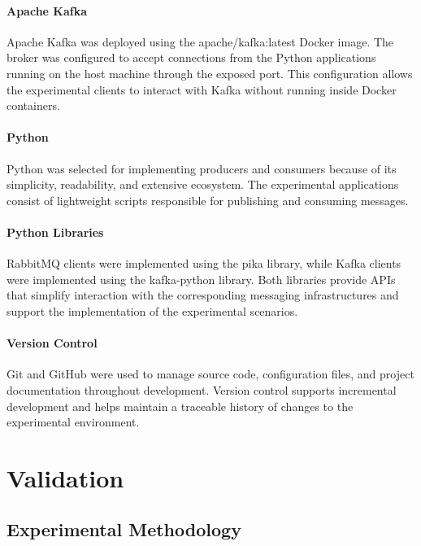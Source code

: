 \documentclass{scrartcl}
\begin{document}
\paragraph{Apache Kafka}

Apache Kafka was deployed using the apache/kafka:latest Docker image. The broker was configured to accept connections from the Python applications running on the host machine through the exposed port. This configuration allows the experimental clients to interact with Kafka without running inside Docker containers.
\paragraph{Python}

Python was selected for implementing producers and consumers because of its simplicity, readability, and extensive ecosystem. The experimental applications consist of lightweight scripts responsible for publishing and consuming messages.

\paragraph{Python Libraries}

RabbitMQ clients were implemented using the pika library, while Kafka clients were implemented using the kafka-python library. Both libraries provide APIs that simplify interaction with the corresponding messaging infrastructures and support the implementation of the experimental scenarios.

\paragraph{Version Control}

Git and GitHub were used to manage source code, configuration files, and project documentation throughout development. Version control supports incremental development and helps maintain a traceable history of changes to the experimental environment.


\section{Validation}\label{validation}

\subsection{Experimental Methodology}
\end{document}
